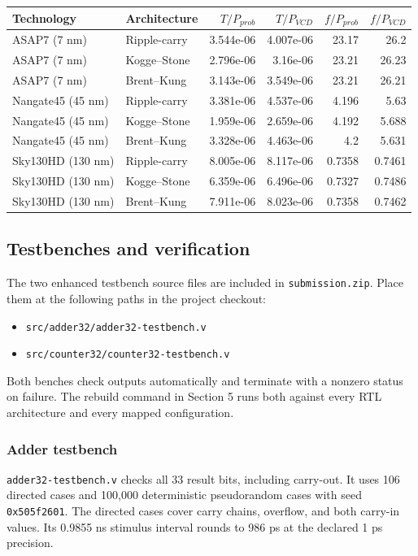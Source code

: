 \documentclass[10pt,letterpaper]{article}
\begin{document}
\begin{center}\small
\begin{tabular}{llrrrr}
\toprule
Technology & Architecture & $T/P_{prob}$ & $T/P_{VCD}$ & $f/P_{prob}$ & $f/P_{VCD}$ \\
\midrule
ASAP7 (7 nm) & Ripple-carry & 3.544e-06 & 4.007e-06 & 23.17 & 26.2 \\
ASAP7 (7 nm) & Kogge--Stone & 2.796e-06 & 3.16e-06 & 23.21 & 26.23 \\
ASAP7 (7 nm) & Brent--Kung & 3.143e-06 & 3.549e-06 & 23.21 & 26.21 \\
Nangate45 (45 nm) & Ripple-carry & 3.381e-06 & 4.537e-06 & 4.196 & 5.63 \\
Nangate45 (45 nm) & Kogge--Stone & 1.959e-06 & 2.659e-06 & 4.192 & 5.688 \\
Nangate45 (45 nm) & Brent--Kung & 3.328e-06 & 4.463e-06 & 4.2 & 5.631 \\
Sky130HD (130 nm) & Ripple-carry & 8.005e-06 & 8.117e-06 & 0.7358 & 0.7461 \\
Sky130HD (130 nm) & Kogge--Stone & 6.359e-06 & 6.496e-06 & 0.7327 & 0.7486 \\
Sky130HD (130 nm) & Brent--Kung & 7.911e-06 & 8.023e-06 & 0.7358 & 0.7462 \\
\bottomrule
\end{tabular}
\end{center}

\clearpage
\subsection{Testbenches and verification}
\label{app:testbenches}
The two enhanced testbench source files are included in \texttt{submission.zip}.
Place them at the following paths in the project checkout:
\begin{itemize}
\item \nolinkurl{src/adder32/adder32-testbench.v}
\item \nolinkurl{src/counter32/counter32-testbench.v}
\end{itemize}
Both benches check outputs automatically and terminate with a nonzero status
on failure. The rebuild command in Section 5 runs both against every RTL
architecture and every mapped configuration.

\subsubsection{Adder testbench}
\texttt{adder32-testbench.v} checks all 33 result bits, including carry-out.
It uses 106 directed cases and 100,000 deterministic pseudorandom cases
with seed \texttt{0x505f2601}. The directed cases cover carry chains,
overflow, and both carry-in values. Its 0.9855 ns stimulus interval rounds
to 986 ps at the declared 1 ps precision.
\end{document}
